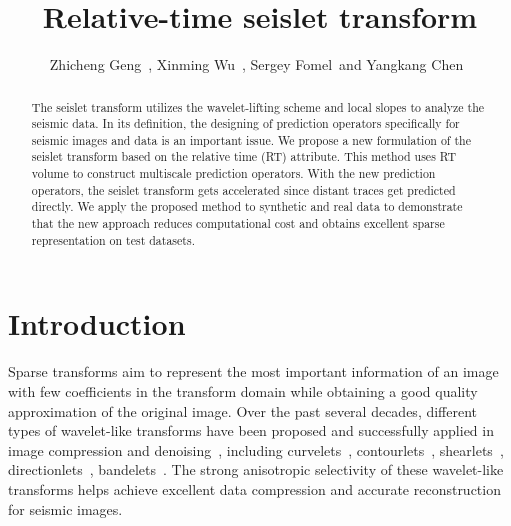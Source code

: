 \title{Relative-time seislet transform}
\author{Zhicheng Geng~\footnotemark[1], 
        Xinming Wu~\footnotemark[1],  
        Sergey Fomel~\footnotemark[1] and
        Yangkang Chen~\footnotemark[2]}


\address{
    \footnotemark[1]Bureau of Economic Geology \\
    John A. and Katherine G. Jackson School of Geosciences \\
    The University of Texas at Austin \\
    University Station, Box X \\
    Austin, Texas, USA \\
    \footnotemark[2]Zhejiang University\\
    School of Earth Sciences\\
    Hangzhou, Zhejiang, China
}


\maketitle

\begin{abstract}
    The seislet transform utilizes the wavelet-lifting scheme and local slopes 
    to analyze the seismic data. 
    In its definition, the designing of prediction operators specifically for 
    seismic images and data is an important issue. 
    We propose a new formulation of the seislet transform based on the relative time (RT) attribute. 
    This method uses RT volume to construct multiscale prediction 
    operators. With the new prediction operators, the seislet transform gets accelerated 
    since distant traces get predicted directly. 
    We apply the proposed method to synthetic and real data to demonstrate that 
    the new approach reduces computational cost and obtains excellent sparse
    representation on test datasets. %
\end{abstract}

\section{Introduction}
    Sparse transforms aim to represent the most important information of an 
    image with few coefficients in the transform domain while obtaining a good 
    quality approximation of the original image. 
    Over the past several decades, different types of wavelet-like transforms 
    have been proposed and successfully applied in image compression and 
    denoising~\cite[]{Hennen2006, Li2013}, including 
    curvelets~\cite[]{Starck2002, Ma2010}, contourlets~\cite[]{Do2005}, 
    shearlets~\cite[]{Demetrio2005}, directionlets~\cite[]{Velisavljevic2006}, 
    bandelets~\cite[]{LePennec2005}. 
    The strong anisotropic selectivity of these wavelet-like transforms helps 
    achieve excellent data compression and accurate reconstruction for seismic 
    images.


